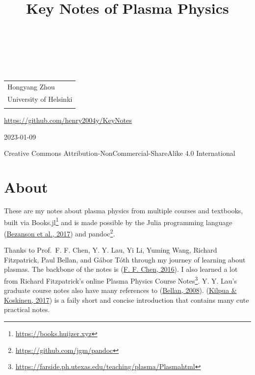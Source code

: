 \documentclass[
  notoc %
]{tufte-book}
\title{Key Notes of Plasma Physics}
\author{\noindent{Hongyang Zhou}\\[3mm] }
\date{}
\DeclareRobustCommand{\href}[2]{#2\footnote{\url{#1}}}
\begin{document}
\makeatletter
\thispagestyle{empty}
\vfill
{\Huge\bf
\noindent
\@title
}\\[1in]
{\Large
\noindent
\@author
}
\makeatother

\makeatletter
\newpage
\thispagestyle{empty}
\vfill
{\noindent
\begin{tabular}{l} Hongyang Zhou\\ University of Helsinki\\ \\ \end{tabular}
}
\vfill
{\small
\url{https://github.com/henry2004y/KeyNotes}

2023-01-09

Creative Commons Attribution-NonCommercial-ShareAlike 4.0 International
}
\makeatother


\frontmatter
\mainmatter
{}

\setcounter{tocdepth}{1}
\tableofcontents

\justifying

\setlength{\parindent}{0pt}

\hypertarget{sec:about}{%
\chapter{About}\label{sec:about}}

These are my notes about plasma physics from multiple courses and
textbooks, built via \href{https://books.huijzer.xyz}{Books.jl} and is
made possible by the Julia programming language
(\protect\hyperlink{ref-bezanson2017julia}{Bezanson et al., 2017}) and
\href{https://github.com/jgm/pandoc}{pandoc}.

Thanks to Prof.~F. F. Chen, Y. Y. Lau, Yi Li, Yuming Wang, Richard
Fitzpatrick, Paul Bellan, and Gábor Tóth through my journey of learning
about plasmas. The backbone of the notes is
(\protect\hyperlink{ref-chen2016introduction}{F. F. Chen, 2016}). I also
learned a lot from Richard Fitzpatrick's online
\href{https://farside.ph.utexas.edu/teaching/plasma/Plasmahtml}{Plasma
Physics Course Notes}. Y. Y. Lau's graduate course notes also have many
references to (\protect\hyperlink{ref-bellan2008fundamentals}{Bellan,
2008}). (\protect\hyperlink{ref-kilpua2017intro}{Kilpua \& Koskinen,
2017}) is a faily short and concise introduction that contains many cute
practical notes.
\end{document}
